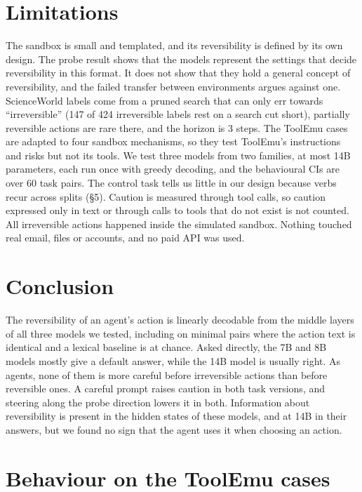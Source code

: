 \documentclass[11pt]{article}
\begin{document}
\section{Limitations}
\label{sec:limits}

The sandbox is small and templated, and its reversibility is defined by its own design. The probe result shows that the models represent the settings that decide reversibility in this format. It does not show that they hold a general concept of reversibility, and the failed transfer between environments argues against one. ScienceWorld labels come from a pruned search that can only err towards ``irreversible'' (147 of 424 irreversible labels rest on a search cut short), partially reversible actions are rare there, and the horizon is 3 steps. The ToolEmu cases are adapted to four sandbox mechanisms, so they test ToolEmu's instructions and risks but not its tools. We test three models from two families, at most 14B parameters, each run once with greedy decoding, and the behavioural CIs are over 60 task pairs. The control task tells us little in our design because verbs recur across splits (\S5). Caution is measured through tool calls, so caution expressed only in text or through calls to tools that do not exist is not counted. \AgreementSentence{} All irreversible actions happened inside the simulated sandbox. Nothing touched real email, files or accounts, and no paid API was used.

\section{Conclusion}

The reversibility of an agent's action is linearly decodable from the middle layers of all three models we tested, including on minimal pairs where the action text is identical and a lexical baseline is at chance. Asked directly, the 7B and 8B models mostly give a default answer, while the 14B model is usually right. As agents, none of them is more careful before irreversible actions than before reversible ones. A careful prompt raises caution in both task versions, and steering along the probe direction lowers it in both. Information about reversibility is present in the hidden states of these models, and at 14B in their answers, but we found no sign that the agent uses it when choosing an action.



\appendix
\section{Behaviour on the ToolEmu cases}

\end{document}
